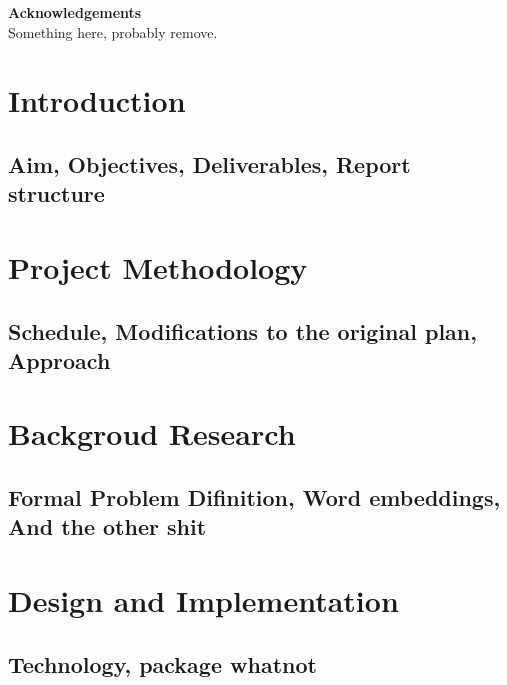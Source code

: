 \documentclass[11pt]{article} %
\begin{document}
\pagestyle{empty}
\tableofcontents %
\newpage %

\vspace{5cm}

\begin{center}
\begin{minipage}{0.8\textwidth}
\centering
\textbf{Acknowledgements}\\[1cm]

Something here, probably remove.

\end{minipage}
\end{center}

\newpage

\pagestyle{plain}
\setcounter{page}{1}


\section{Introduction}
\subsection{Aim, Objectives, Deliverables, Report structure}
\section{Project Methodology}
\subsection{Schedule, Modifications to the original plan, Approach}
\section{Backgroud Research}
\subsection{Formal Problem Difinition, Word embeddings, And the other shit}

\section{Design and Implementation}
\subsection{Technology, package whatnot}
\end{document}
